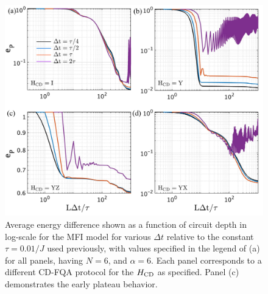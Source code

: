 \documentclass[twocolumn,aps,superscriptaddress,floatfix,longbibliography]{revtex4-2}
\newcommand{\awc}[1]{{\color[rgb]{.8,.6,.6}{[AW: {\it #1}\,]}}}
\begin{document}
\begin{figure}
    \centering
    \includegraphics[scale=0.11]{deltat_final.pdf}
    \caption{
    Average energy difference shown as a function of circuit depth in log-scale for the MFI model
    for %
    various $\Delta t$ relative to the constant
    $\tau = 0.01/J$ %
    used previously,
    with values specified in the legend of (a) for
    all panels, having $N=6$, and $\alpha=6$.
    Each panel %
    corresponds to a different CD-FQA protocol
    for the $H_{\rm CD}$ as specified.
    Panel (c) demonstrates the early plateau behavior.
}\label{fig:deltat_final}
\end{figure}
 
\end{document}
